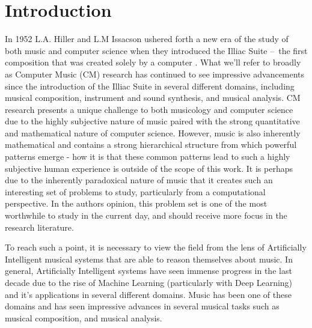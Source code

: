 \chapter{Introduction} \label{ch:introduction}


In 1952 L.A. Hiller and L.M Issacson ushered forth a new era of the study of both music and computer science when they introduced the Illiac Suite – the first composition that was created solely by a computer \cite{sandred2009revisiting}. What we'll refer to broadly as Computer Music (CM) research has continued to see impressive advancements since the introduction of the Illiac Suite in several different domains, including musical composition\cite{briot2017deep}, instrument and sound synthesis\cite{engel2017neural}, and musical analysis\cite{widmer2016getting}. CM research presents a unique challenge to both musicology and computer science due to the highly subjective nature of music paired with the strong quantitative and mathematical nature of computer science. However, music is also inherently mathematical and contains a strong hierarchical structure from which powerful patterns emerge - how it is that these common patterns lead to such a highly subjective human experience is outside of the scope of this work. It is perhaps due to the inherently paradoxical nature of music that it creates such an interesting set of problems to study, particularly from a computational perspective. In the authors opinion, this problem set is one of the most worthwhile to study in the current day, and should receive more focus in the research literature. 


To reach such a point, it is necessary to view the field from the lens of Artificially Intelligent musical systems that are able to reason themselves about music. In general, Artificially Intelligent systems have seen immense progress in the last decade due to the rise of Machine Learning (particularly with Deep Learning) and it's applications in several different domains. Music has been one of these domains and has seen impressive advances in several musical tasks such as musical composition\cite{huang2018music}, and musical analysis\cite{widmer2016getting}. 

